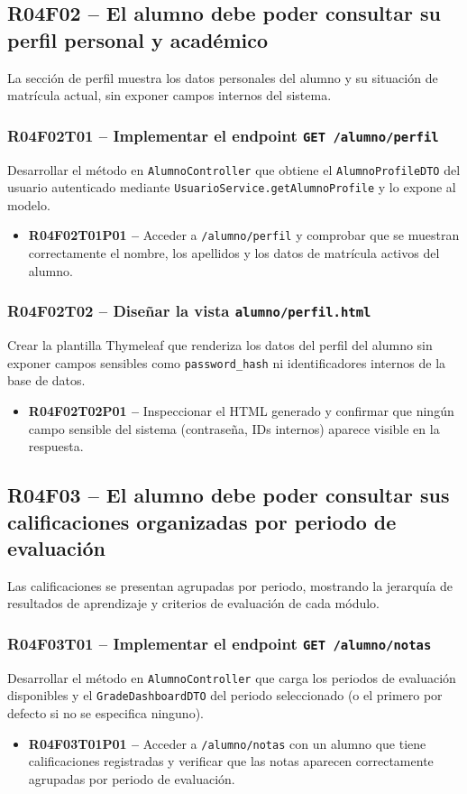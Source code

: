 \documentclass[12pt, a4paper]{report}
\begin{document}
\subsection{R04F02 -- El alumno debe poder consultar su perfil personal y académico}

La sección de perfil muestra los datos personales del alumno y su situación de matrícula actual, sin exponer campos internos del sistema.

\subsubsection{R04F02T01 -- Implementar el endpoint \texttt{GET /alumno/perfil}}
Desarrollar el método en \texttt{AlumnoController} que obtiene el \texttt{AlumnoProfileDTO} del usuario autenticado mediante \texttt{UsuarioService.getAlumnoProfile} y lo expone al modelo.
\begin{itemize}
  \item \textbf{R04F02T01P01 --} Acceder a \texttt{/alumno/perfil} y comprobar que se muestran correctamente el nombre, los apellidos y los datos de matrícula activos del alumno.
\end{itemize}

\subsubsection{R04F02T02 -- Diseñar la vista \texttt{alumno/perfil.html}}
Crear la plantilla Thymeleaf que renderiza los datos del perfil del alumno sin exponer campos sensibles como \texttt{password\_hash} ni identificadores internos de la base de datos.
\begin{itemize}
  \item \textbf{R04F02T02P01 --} Inspeccionar el HTML generado y confirmar que ningún campo sensible del sistema (contraseña, IDs internos) aparece visible en la respuesta.
\end{itemize}

\subsection{R04F03 -- El alumno debe poder consultar sus calificaciones organizadas por periodo de evaluación}

Las calificaciones se presentan agrupadas por periodo, mostrando la jerarquía de resultados de aprendizaje y criterios de evaluación de cada módulo.

\subsubsection{R04F03T01 -- Implementar el endpoint \texttt{GET /alumno/notas}}
Desarrollar el método en \texttt{AlumnoController} que carga los periodos de evaluación disponibles y el \texttt{GradeDashboardDTO} del periodo seleccionado (o el primero por defecto si no se especifica ninguno).
\begin{itemize}
  \item \textbf{R04F03T01P01 --} Acceder a \texttt{/alumno/notas} con un alumno que tiene calificaciones registradas y verificar que las notas aparecen correctamente agrupadas por periodo de evaluación.
\end{itemize}
\end{document}
